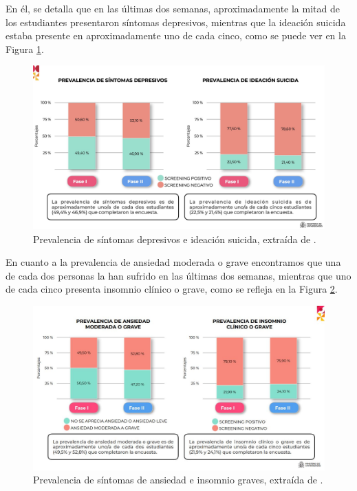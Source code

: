     En él, se detalla que en las últimas dos semanas, aproximadamente la mitad de los estudiantes presentaron síntomas depresivos, mientras que la ideación suicida estaba presente en aproximadamente uno de cada cinco, como se puede ver en la Figura \ref{fig:intro:sintomas_depresivos_suicida}. 
    
    \begin{figure}[h]
        \centering
        \includegraphics[width=0.85\linewidth]{figures/Sintomas depresion suicidio.jpg}
        \caption[Prevalencia de síntomas depresivos e ideación suicida]{Prevalencia de síntomas depresivos e ideación suicida, extraída de \cite{ministerio_de_universidades_salud_2023}.}
        \label{fig:intro:sintomas_depresivos_suicida}
    \end{figure}
    
    En cuanto a la prevalencia de ansiedad moderada o grave encontramos que una de cada dos personas la han sufrido en las últimas dos semanas, mientras que uno de cada cinco presenta insomnio clínico o grave, como se refleja en la Figura \ref{fig:intro:sintomas_ansiedad_insomnio}. 
    
    \begin{figure}[h]
        \centering
        \includegraphics[width=0.85\linewidth]{figures/Sintomas ansiedad insomnio.JPG}
        \caption[Prevalencia de síntomas de ansiedad e insomnio graves]{Prevalencia de síntomas de ansiedad e insomnio graves, extraída de \cite{ministerio_de_universidades_salud_2023}.}
        \label{fig:intro:sintomas_ansiedad_insomnio}
    \end{figure}
    

